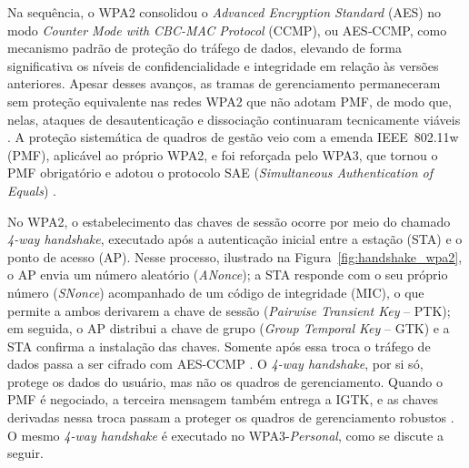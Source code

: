 Na sequência, o WPA2 consolidou o \textit{Advanced Encryption Standard} (AES) no modo \textit{Counter Mode with CBC-MAC Protocol} (CCMP), ou AES‑CCMP, como mecanismo padrão de proteção do tráfego de dados, elevando de forma significativa os níveis de confidencialidade e integridade em relação às versões anteriores. Apesar desses avanços, as tramas de gerenciamento permaneceram sem proteção equivalente nas redes WPA2 que não adotam PMF, de modo que, nelas, ataques de desautenticação e dissociação continuaram tecnicamente viáveis \cite{KohliosHayajneh2018}. A proteção sistemática de quadros de gestão veio com a emenda IEEE~802.11w (PMF), aplicável ao próprio WPA2, e foi reforçada pelo WPA3, que tornou o PMF obrigatório e adotou o protocolo SAE (\textit{Simultaneous Authentication of Equals}) \cite{CiscoMFP2024,EspressifWifiSecurity}.

No WPA2, o estabelecimento das chaves de sessão ocorre por meio do chamado \textit{4-way handshake}, executado após a autenticação inicial entre a estação (STA) e o ponto de acesso (AP). Nesse processo, ilustrado na Figura~\ref{fig:handshake_wpa2}, o AP envia um número aleatório (\textit{ANonce}); a STA responde com o seu próprio número (\textit{SNonce}) acompanhado de um código de integridade (MIC), o que permite a ambos derivarem a chave de sessão (\textit{Pairwise Transient Key} -- PTK); em seguida, o AP distribui a chave de grupo (\textit{Group Temporal Key} -- GTK) e a STA confirma a instalação das chaves. Somente após essa troca o tráfego de dados passa a ser cifrado com AES-CCMP \cite{KohliosHayajneh2018}. O \textit{4-way handshake}, por si só, protege os dados do usuário, mas não os quadros de gerenciamento. Quando o PMF é negociado, a terceira mensagem também entrega a IGTK, e as chaves derivadas nessa troca passam a proteger os quadros de gerenciamento robustos \cite{CiscoMFP2024}. O mesmo \textit{4-way handshake} é executado no WPA3-\textit{Personal}, como se discute a seguir.

